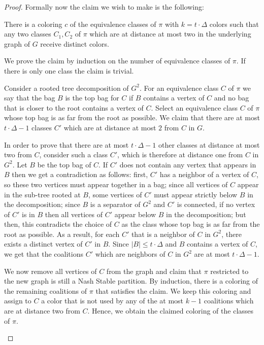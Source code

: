 \documentclass[letterpaper,USenglish,cleveref, autoref, thm-restate]{lipics-v2021}
\begin{document}
\begin{proof}
Formally now the claim we wish to make is the following:

\begin{claim}\label{claim} There is a coloring $c$ of the equivalence classes
of $\pi$ with $k=t\cdot \Delta$ colors such that any two classes $C_1,C_2$ of
$\pi$ which are at distance at most two in the underlying graph of $G$ receive
distinct colors.  \end{claim}

\begin{claimproof}

We prove the claim by induction on the number of equivalence classes of $\pi$.
If there is only one class the claim is trivial.

Consider a rooted tree decomposition of $G^2$. For an equivalence class $C$ of
$\pi$ we say that the bag $B$ is the top bag for $C$ if $B$ contains a vertex
of $C$ and no bag that is closer to the root contains a vertex of $C$. Select
an equivalence class $C$ of $\pi$ whose top bag is as far from the root as
possible. We claim that there are at most $t\cdot\Delta-1$ classes $C'$ which
are at distance at most $2$ from $C$ in $G$.  

In order to prove that there are at most $t\cdot\Delta-1$ other classes at
distance at most two from $C$, consider such a class $C'$, which is therefore
at distance one from $C$ in $G^2$. Let $B$ be the top bag of $C$.  If $C'$ does
not contain any vertex that appears in $B$ then we get a contradiction as
follows: first, $C'$ has a neighbor of a vertex of $C$, so these two vertices
must appear together in a bag; since all vertices of $C$ appear in the sub-tree
rooted at $B$, some vertices of $C'$ must appear strictly below $B$ in the
decomposition; since $B$ is a separator of $G^2$ and $C'$ is connected, if no
vertex of $C'$ is in $B$ then all vertices of $C'$ appear below $B$ in the
decomposition; but then, this contradicts the choice of $C$ as the class whose
top bag is as far from the root as possible. As a result, for each $C'$ that is
a neighbor of $C$ in $G^2$, there exists a distinct vertex of $C'$ in $B$.
Since $|B|\le t\cdot \Delta$ and $B$ contains a vertex of $C$, we get that the
coalitions $C'$ which are neighbors of $C$ in $G^2$ are at most $t\cdot
\Delta-1$.  

We now remove all vertices of $C$ from the graph and claim that $\pi$
restricted to the new graph is still a Nash Stable partition. By induction,
there is a coloring of the remaining coalitions of $\pi$ that satisfies the
claim. We keep this coloring and assign to $C$ a color that is not used by any
of the at most $k-1$ coalitions which are at distance two from $C$. Hence, we
obtain the claimed coloring of the classes of $\pi$.  \end{claimproof}


\end{proof}
\end{document}
